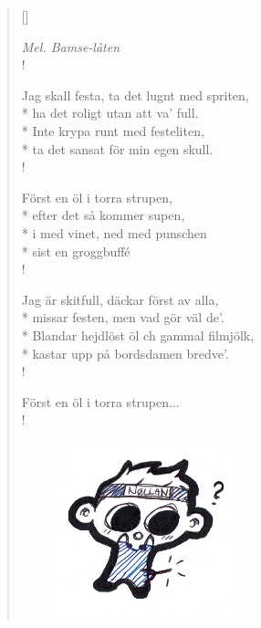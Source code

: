 
\settowidth{\versewidth}{Inte krypa runt med festeliten,}



\begin{verse}[\versewidth]

\flagverse{}
\emph{Mel. Bamse-låten}\\!

Jag skall festa, ta det lugnt med spriten,\\*
ha det roligt utan att va' full.\\*
Inte krypa runt med festeliten,\\*
ta det sansat för min egen skull.\\!


Först en öl i torra strupen,\\*
efter det så kommer supen,\\*
i med vinet, ned med punschen\\*
sist en groggbuffé\\!


Jag är skitfull, däckar först av alla,\\*
missar festen, men vad gör väl de'.\\*
Blandar hejdlöst öl ch gammal filmjölk,\\*
kastar upp på bordsdamen bredve'.\\!


Först en öl i torra strupen...\\!


\begin{figure}[H]
    \centering
    \includegraphics[width=0.5\textwidth]{nollan_ben.png}
\end{figure}


\end{verse}
